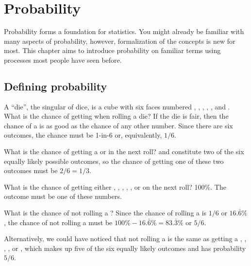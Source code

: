 \chapter{Probability}
\label{probability}


Probability forms a foundation for statistics. You might already be familiar with many aspects of probability, however, formalization of the concepts is new for most. This chapter aims to introduce probability on familiar terms using processes most people have seen before.

\section{Defining probability}
\label{basicsOfProbability}

\begin{example}{A ``die'', the singular of dice, is a cube with six faces numbered , , , , , and . What is the chance of getting  when rolling a die?}\label{probOf1}
If the die is fair, then the chance of a  is as good as the chance of any other number. Since there are six outcomes, the chance must be 1-in-6 or, equivalently, $1/6$.
\end{example}

\begin{example}{What is the chance of getting a  or  in the next roll?}\label{probOf1Or2}
 and  constitute two of the six equally likely possible outcomes, so the chance of getting one of these two outcomes must be $2/6 = 1/3$.
\end{example}

\begin{example}{What is the chance of getting either , , , , , or  on the next roll?}\label{probOf123456}
100\%. The outcome must be one of these numbers.
\end{example}

\begin{example}{What is the chance of not rolling a ?}\label{probNot2}
Since the chance of rolling a  is $1/6$ or $16.\bar{6}\%$, the chance of not rolling a  must be $100\% - 16.\bar{6}\%=83.\bar{3}\%$ or $5/6$.

Alternatively, we could have noticed that not rolling a  is the same as getting a , , , , or , which makes up five of the six equally likely outcomes and has probability $5/6$.
\end{example}

